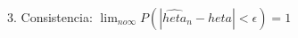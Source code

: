 \documentclass[preview]{standalone}
\begin{document}
\begin{center}
3. Consistencia: $\lim_{n 	o \infty} P(|\hat{	heta}_n - 	heta| < \epsilon) = 1$
\end{center}
\end{document}
